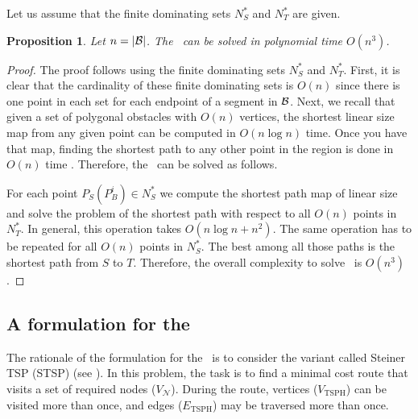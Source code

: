 \documentclass[a4paper,  review, authoryear, 1p.]{elsarticle}
\newcommand{\SPPN}{{\sf{H-SPPN}\xspace }}
\newcommand{\TSPHN}{{\sf{H-TSPHN}\xspace }}
\newcommand{\VN}{{V^{}_{\mathcal N}}}
\newcommand{\VTSPH}{{V_{\text{TSPH}}}}
\newcommand{\ETSPH}{{E_{\text{TSPH}}}}
\newtheorem{prop}{Proposition}
\newcommand{\JP}[1]{{\color{armygreen}#1}}
\newcommand{\CV}[1]{{\color{red}#1}}
\begin{document}
	\JP{Let us assume that the finite dominating sets $N^*_{S}$ and $N^*_{T}$ are given.}
	\begin{prop}
		Let $n=|\cal B|$. The \SPPN \ can be solved in polynomial time $O(n^3)$.
	\end{prop}
	\begin{proof}
		The proof follows using the finite dominating sets $N^*_{S}$ and $N^*_{T}$. First, it is clear that the cardinality of these finite dominating sets is $O(n)$ since there is one point in each set for each  \JP{endpoint} of a segment in $\cal B$. Next, we recall that given a set of polygonal obstacles with $O(n)$ vertices, the shortest linear size map from any given point can be computed in 
		$O(n\log n)$ time. Once you have that map, finding the shortest path to any other point in the region is done in $O(n)$ time \citep{mitchell2017a}. Therefore, the \SPPN \ can be solved as follows.
		
		For each point $P_S(P_B^i) \in N^*_S$ we compute the shortest path map of linear size and solve the problem of the shortest path with respect to all $O(n)$ points in $N^*_T$. In general, this operation takes $O(n\log n + n^2)$. The same operation has to be repeated for all $O(n)$ points in $N^*_S$. \JP{The best among all those paths is the shortest path from $S$ to $T$.} Therefore, the overall complexity to solve \SPPN \ is $O(n^3)$.
		
	\end{proof}		
	
	
	\subsection{A formulation for the \TSPHN}
	
	
	The rationale of the formulation for the \TSPHN \ is to consider the variant called Steiner TSP (STSP) (see \citet{letchford2013}). \CV{In this problem, the task is to find a minimal cost route that visits a set of required nodes ($\VN$). During the route, vertices ($\VTSPH$) can be visited more than once, and edges ($\ETSPH$) may be traversed more than once.}

	
\end{document}
